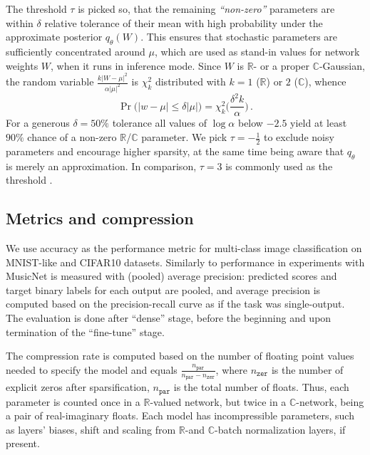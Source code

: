 \documentclass[a4paper,10pt]{article}
\newcommand{\real}{\mathbb{R}}
\newcommand{\cplx}{\mathbb{C}}
\begin{document}
The threshold $\tau$ is picked so, that the remaining \textit{``non-zero''} parameters
are within $\delta$ relative tolerance of their mean with high probability under the
approximate posterior $q_\theta(W)$. This ensures that stochastic parameters are sufficiently
concentrated around $\mu$, which are used as stand-in values for network weights $W$,
when it runs in inference mode. Since $W$ is $\real$- or a proper $\cplx$-Gaussian, the
random variable $
  \tfrac{k \lvert W - \mu \rvert^2}
        {\alpha \lvert \mu \rvert^2}
$ is $\chi^2_k$ distributed with $k=1$ ($\real$) or $2$ ($\cplx$), whence
\begin{equation} \label{eq:prob_relevant}
  \Pr\bigl(
    \lvert w - \mu \rvert \leq \delta \lvert \mu \rvert
  \bigr)
    = \chi^2_k\biggl(\frac{\delta^2 k}{\alpha}\biggr)
  \,.
\end{equation}
For a generous $\delta = 50\%$ tolerance all values of $\log \alpha$ below $-2.5$ yield
at least $90\%$ chance of a non-zero $\real$/$\cplx$ parameter. We pick $\tau = -\tfrac12$
to exclude noisy parameters and encourage higher sparsity, at the same time being aware
that $q_\theta$ is merely an approximation. In comparison, $\tau = 3$ is commonly used as
the threshold \citep{molchanov_variational_2017,kingma_variational_2015}.



\subsection{Metrics and compression} %
\label{sub:metrics_and_compression}

We use accuracy as the performance metric for multi-class image classification on MNIST-like
and CIFAR10 datasets. Similarly to \citet{trabelsi_deep_2017} performance in experiments with
MusicNet is measured with (pooled) average precision: predicted scores and target binary labels
for each output are pooled, and average precision is computed based on the precision-recall
curve as if the task was single-output. The evaluation is done after ``dense'' stage, before
the beginning and upon termination of the ``fine-tune'' stage.

The compression rate is computed based on the number of floating point values needed to
specify the model and equals $
  \tfrac{n_\mathtt{par}}{n_\mathtt{par} - n_\mathtt{zer}}
$, where $n_\mathtt{zer}$ is the number of explicit zeros after sparsification, $n_\mathtt{par}$
is the total number of floats. Thus, each parameter is counted once in a $\real$-valued
network, but twice in a $\cplx$-network, being a pair of real-imaginary floats. Each model
has incompressible parameters, such as layers' biases, shift and scaling from $\real$-and
$\cplx$-batch normalization layers, if present.
\end{document}
